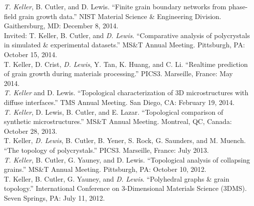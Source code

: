 \documentclass[margin]{res}
\begin{document}
\begin{resume}
\baselineskip
\emph{T. Keller}, B. Cutler, and D. Lewis. ``Finite grain boundary networks from phase-field grain growth data.''
 NIST Material Science \& Engineering Division. Gaithersburg, MD: December 8, 2014.\\[0.25\baselineskip]
Invited: T. Keller, B. Cutler, and \emph{D. Lewis}. ``Comparative analysis of polycrystals in simulated \& experimental datasets.''
 MS\&T Annual Meeting. Pittsburgh, PA: October 15, 2014.\\[0.25\baselineskip]
T. Keller, D. Crist, \emph{D. Lewis}, Y. Tan, K. Huang, and C. Li. ``Realtime prediction of grain growth during materials processing.''
 PICS3. Marseille, France: May 2014.\\[0.25\baselineskip]
\emph{T. Keller} and D. Lewis. ``Topological characterization of 3D microstructures with diffuse interfaces.'' TMS Annual Meeting. San Diego, CA: February 19, 2014.\\[0.25\baselineskip]
\baselineskip
\emph{T. Keller}, D. Lewis, B. Cutler, and E. Lazar. ``Topological comparison of synthetic microstructures.''
 MS\&T Annual Meeting. Montreal, QC, Canada: October 28, 2013.\\[0.25\baselineskip]
T. Keller, \emph{D. Lewis}, B. Cutler, B. Yener, S. Rock, G. Saunders, and M. Muench. ``The topology of polycrystals.''
 PICS3. Marseille, France: July 2013.\\[0.25\baselineskip]
\baselineskip
\emph{T. Keller}, B. Cutler, G. Yauney, and D. Lewis. ``Topological analysis of collapsing grains.''
 MS\&T Annual Meeting. Pittsburgh, PA: October 10, 2012.\\[0.25\baselineskip]
T. Keller, B. Cutler, G. Yauney, and \emph{D. Lewis}. ``Polyhedral graphs \& grain topology.''
 International Conference on 3-Dimensional Materials Science (3DMS). Seven Springs, PA: July 11, 2012.\\[0.25\baselineskip]
\baselineskip


\end{resume}
\end{document}
